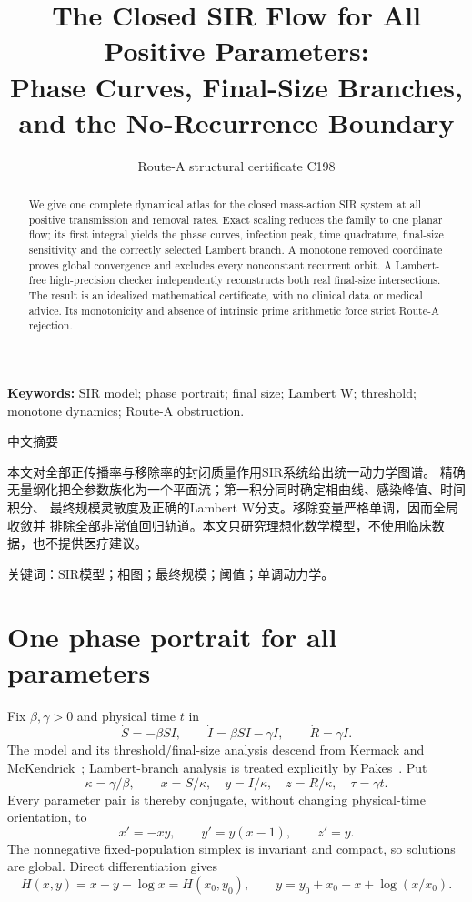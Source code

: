\documentclass[9pt]{extarticle}
\title{The Closed SIR Flow for All Positive Parameters:\\
Phase Curves, Final-Size Branches, and the No-Recurrence Boundary}
\author{Route-A structural certificate C198}
\date{}
\begin{document}
\maketitle
\begin{abstract}
We give one complete dynamical atlas for the closed mass-action SIR system at
all positive transmission and removal rates.  Exact scaling reduces the family
to one planar flow; its first integral yields the phase curves, infection peak,
time quadrature, final-size sensitivity and the correctly selected Lambert
branch.  A monotone removed coordinate proves global convergence and excludes
every nonconstant recurrent orbit.  A Lambert-free high-precision checker
independently reconstructs both real final-size intersections.  The result is
an idealized mathematical certificate, with no clinical data or medical advice.
Its monotonicity and absence of intrinsic prime arithmetic force strict Route-A
rejection.
\end{abstract}
\noindent\textbf{Keywords:} SIR model; phase portrait; final size; Lambert W;
threshold; monotone dynamics; Route-A obstruction.

\begin{otherlanguage}{chinese-simplified}
\begin{center}{\large 中文摘要}\end{center}
本文对全部正传播率与移除率的封闭质量作用\foreignlanguage{english}{SIR}系统给出统一动力学图谱。
精确无量纲化把全参数族化为一个平面流；第一积分同时确定相曲线、感染峰值、时间积分、
最终规模灵敏度及正确的\foreignlanguage{english}{Lambert W}分支。移除变量严格单调，因而全局收敛并
排除全部非常值回归轨道。本文只研究理想化数学模型，不使用临床数据，也不提供医疗建议。

\noindent 关键词：\foreignlanguage{english}{SIR}模型；相图；最终规模；阈值；单调动力学。
\end{otherlanguage}

\section{One phase portrait for all parameters}
Fix $\beta,\gamma>0$ and physical time $t$ in
\[
 \dot S=-\beta SI,\qquad \dot I=\beta SI-\gamma I,
 \qquad \dot R=\gamma I .
\]
The model and its threshold/final-size analysis descend from Kermack and
McKendrick~\cite{KM27}; Lambert-branch analysis is treated explicitly by
Pakes~\cite{P15}.  Put
\[
 \kappa=\gamma/\beta,\qquad x=S/\kappa,\quad y=I/\kappa,
 \quad z=R/\kappa,\quad \tau=\gamma t.
\]
Every parameter pair is thereby conjugate, without changing physical-time
orientation, to
\begin{equation}\label{eq:flow}
 x'=-xy,\qquad y'=y(x-1),\qquad z'=y.
\end{equation}
The nonnegative fixed-population simplex is invariant and compact, so solutions
are global.  Direct differentiation gives
\begin{equation}\label{eq:first}
 H(x,y)=x+y-\log x=H(x_0,y_0),\qquad
 y=y_0+x_0-x+\log(x/x_0).
\end{equation}
\end{document}
